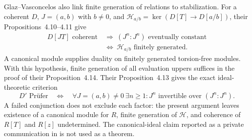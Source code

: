 Glaz--Vasconcelos also link finite generation of relations to
stabilization. For a coherent $D$, $J=(a,b)$ with $b\ne0$, and
$\mathcal H_{a/b}=\ker(D[T]\to D[a/b])$, their
Propositions~4.10--4.11 give \cite{GlazVasconcelos1984}
\begin{align*}
 D[JT]\text{ coherent}
 &\ \Longrightarrow\ (J^n:J^n)\text{ eventually constant}\\
 &\ \Longleftrightarrow\ \mathcal H_{a/b}\text{ finitely generated}.
\end{align*}
A canonical module supplies duality on finitely generated torsion-free
modules. With this hypothesis, finite generation of all evaluation
uppers suffices in the proof of their Proposition~4.14. Their
Proposition~4.13 gives the exact ideal-theoretic criterion
\[
 D'\text{ Pr\"ufer}\quad\Longleftrightarrow\quad
 \forall J=(a,b)\ne0\ \exists n\geq1:
 J^n\text{ invertible over }(J^n:J^n).
\]
A failed conjunction does not exclude each factor: the
present argument leaves existence of a canonical module for $R$,
finite generation of $\mathcal H$, and coherence of $R[T]$ and $R[z]$
undetermined. The canonical-ideal claim reported as a private
communication in \cite[p.~336]{PapickCoherentOverrings1979} is not used
as a theorem.
